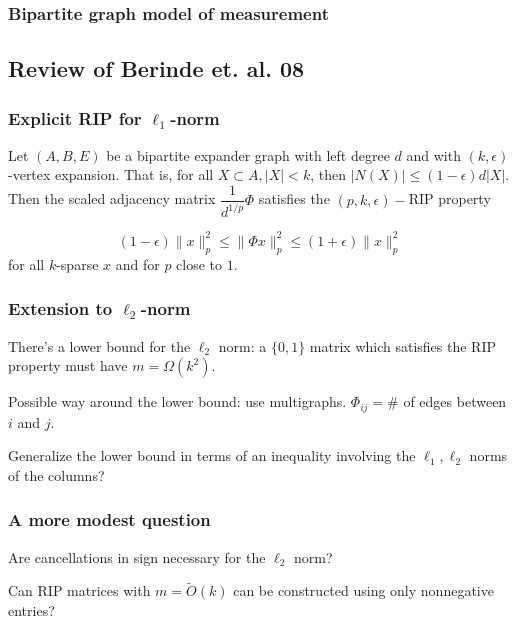 \documentclass[aspectratio=34]{beamer}
\begin{document}
\begin{frame}
\end{frame}

\begin{frame}
\frametitle{Bipartite graph model of measurement}	
\end{frame}


\subsection{Review of Berinde et. al. 08}
\begin{frame}
    \frametitle{Explicit RIP for $\ell_1$-norm}
    \begin{theorem}
    Let $(A,B,E)$ be a bipartite expander graph with left degree $d$ and with $(k,\epsilon)$-vertex expansion. That is, for all $X \subset A, |X| < k$, then $|N(X)| \le (1-\epsilon)d|X|$. Then the scaled adjacency matrix $\dfrac{1}{d^{1/p}}\Phi$ satisfies the $(p,k,\epsilon)-$RIP property
    
    \[(1-\epsilon)\|x\|_p^2 \le \|\Phi x\|_p^2 \le (1+\epsilon)\|x\|_p^2\]
    for all $k$-sparse $x$ and for $p$ close to $1$. 
	
    \end{theorem}	

\end{frame}

\begin{frame}
\frametitle{Extension to $\ell_2$-norm}
There's a lower bound for the $\ell_2$ norm: a $\{0,1\}$ matrix which satisfies the RIP property must have $m = \Omega(k^2)$. 

Possible way around the lower bound: use multigraphs. $\Phi_{ij} = \#$ of edges between $i$ and $j$. 

Generalize the lower bound in terms of an inequality involving the $\ell_1,\ell_2$ norms of the columns?

\end{frame}


\begin{frame}
\frametitle{A more modest question}
Are cancellations in sign necessary for the $\ell_2$ norm?

Can RIP matrices with $m = \tilde{O}(k)$ can be constructed using only nonnegative entries?
 
\end{frame}
\end{document}
